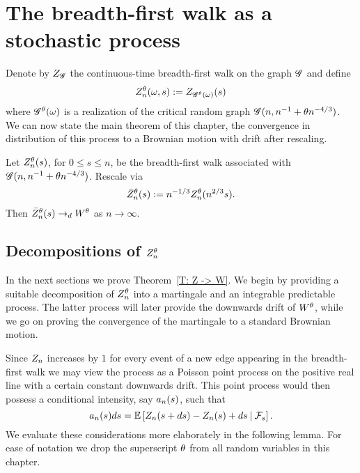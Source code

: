 \section{The breadth-first walk as a stochastic process}

Denote by $Z_{\mathscr{G}}$ the continuous-time breadth-first walk on the graph $\mathscr{G}$
and define
\begin{equation} \label{D: znt}
	Z_n^{\theta}(\omega, s) := Z_{\mathscr{G}^{\theta}(\omega)}(s)
\end{equation}
where $\mathscr{G}^{\theta}(\omega)$ is a realization of the critical random graph $\mathscr{G}(n, n^{-1} + \theta n^{-4/3})$.
We can now state the main theorem of this chapter,
the convergence in distribution of this process to a Brownian motion with drift after rescaling.

\begin{theorem} \label{T: Z -> W}
	Let $Z_n^{\theta}(s)$, for $0 \leq s \leq n$, 
	be the breadth-first walk associated with $\mathscr{G}(n, n^{-1} + \theta n^{-4/3})$.
	Rescale via
	\begin{equation}
	\bar{Z}^{\theta}_n(s) := n^{-1 / 3} Z_n^{\theta}(n^{2 / 3}s).
	\end{equation}
	Then $\bar{Z}^{\theta}_n(s) \rightarrow_d W^{\theta}$ as $n \rightarrow \infty$.
\end{theorem}


\subsection{Decompositions of $Z_n^{\theta}$}

In the next sections we prove Theorem~\ref{T: Z -> W}.
We begin by providing a suitable decomposition of $Z_n^{\theta}$ into a martingale and
an integrable predictable process.
The latter process will later provide the downwards drift of $W^{\theta}$,
while we go on proving the convergence of the martingale to a standard Brownian motion.

Since $Z_n$ increases by $1$ for every event of a new edge appearing in the breadth-first walk
we may view the process as a Poisson point process on the positive real line with a certain constant downwards drift.
This point process would then possess a conditional intensity, say $a_n(s)$, such that
\begin{equation}
	a_n(s)ds = \mathbb{E} \left[  Z_n(s + ds) - Z_n(s) + ds \: | \: \mathcal{F}_{s}  \right].
\end{equation}
We evaluate these considerations more elaborately in the following lemma.
For ease of notation we drop the superscript $\theta$ from all random variables in this chapter.

